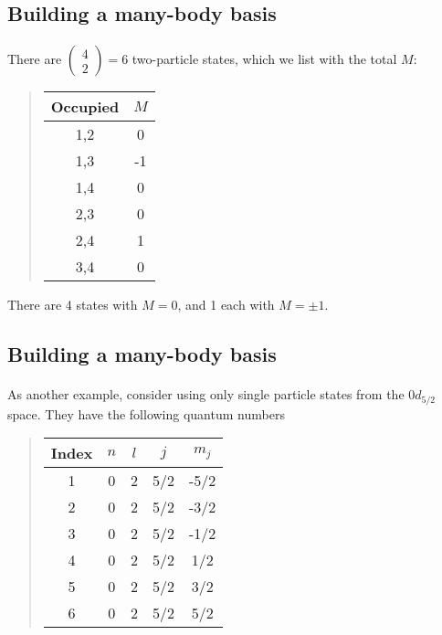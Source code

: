 \subsection*{Building a many-body basis}

\paragraph{}
There are $\left ( \begin{array}{c} 4 \\ 2 \end{array} \right) = 6$ two-particle states, 
which we list with the total $M$:


\begin{quote}
\begin{tabular}{cc}
\hline
\multicolumn{1}{c}{ Occupied } & \multicolumn{1}{c}{ $M$ } \\
\hline
1,2      & 0   \\
1,3      & -1  \\
1,4      & 0   \\
2,3      & 0   \\
2,4      & 1   \\
3,4      & 0   \\
\hline
\end{tabular}
\end{quote}

\noindent
There are 4 states with $M= 0$, 
and 1 each with $M = \pm 1$.



\subsection*{Building a many-body basis}

\paragraph{}
As another example, consider using only single particle states from the $0d_{5/2}$ space. 
They have the following quantum numbers


\begin{quote}
\begin{tabular}{ccccc}
\hline
\multicolumn{1}{c}{ Index } & \multicolumn{1}{c}{ $n$ } & \multicolumn{1}{c}{ $l$ } & \multicolumn{1}{c}{ $j$ } & \multicolumn{1}{c}{ $m_j$ } \\
\hline
1     & 0   & 2   & 5/2 & -5/2  \\
2     & 0   & 2   & 5/2 & -3/2  \\
3     & 0   & 2   & 5/2 & -1/2  \\
4     & 0   & 2   & 5/2 & 1/2   \\
5     & 0   & 2   & 5/2 & 3/2   \\
6     & 0   & 2   & 5/2 & 5/2   \\
\hline
\end{tabular}
\end{quote}


